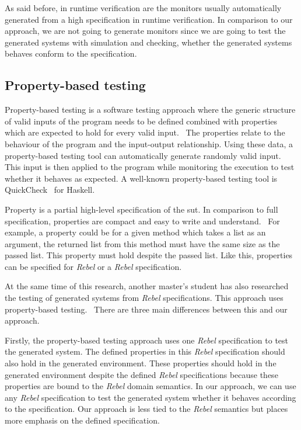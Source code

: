 As said before, in runtime verification are the monitors usually automatically
generated from a high specification in runtime verification. In comparison to
our approach, we are not going to generate monitors since we are going to test
the generated systems with simulation and checking,
whether the generated systems behaves conform to the specification.

\subsection*{Property-based testing}

Property-based testing is a software testing approach where the generic
structure of valid inputs of the program needs to be defined combined with
properties which are expected to hold for every valid
input.~\cite[p.~3]{papadakis2011proper} The properties relate to the behaviour
of the program and the input-output relationship. Using these data, a
property-based testing tool can automatically generate randomly valid input.
This input is then applied to the program while monitoring the execution to
test whether it behaves as expected. A well-known property-based testing tool is
QuickCheck~\cite{claessen2011quickcheck} for Haskell.

Property is a partial high-level specification of the \gls{sut}. In comparison
to full specification, properties are compact and easy to write and
understand.~\cite[p.~3]{papadakis2011proper} For example, a property could be
for a given method which takes a list as an argument, the returned list from
this method must have the same size as the passed list. This property must hold
despite the passed list. Like this, properties can be specified for
\textit{Rebel} or a \textit{Rebel} specification.

At the same time of this research, another master's student has also researched
the testing of generated systems from \textit{Rebel} specifications.
This approach uses property-based testing.~\cite{kok2017property}
There are three main differences between this and our approach.

Firstly, the property-based testing approach uses one \textit{Rebel}
specification to test the generated system. The defined properties in this
\textit{Rebel} specification should also hold in the generated environment.
These properties should hold in the generated environment despite the defined
\textit{Rebel} specifications because these properties are bound to the
\textit{Rebel} domain semantics. In our approach, we can use any \textit{Rebel}
specification to test the generated system whether it behaves according to the
specification. Our approach is less tied to the \textit{Rebel} semantics but
places more emphasis on the defined specification.


